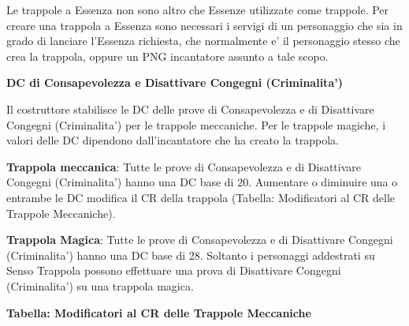 \documentclass[a4paper,11pt,twoside,openany]{dndbook}
\begin{document}
Le trappole a Essenza non sono altro che Essenze utilizzate come trappole. Per creare una trappola a Essenza sono necessari i servigi di un personaggio che sia in grado di lanciare l'Essenza richiesta, che normalmente e' il personaggio stesso che crea la trappola, oppure un PNG incantatore assunto a tale scopo.

\textbf{DC di Consapevolezza e Disattivare Congegni (Criminalita')}

Il costruttore stabilisce le DC delle prove di Consapevolezza e di Disattivare Congegni (Criminalita') per le trappole meccaniche. Per le trappole magiche, i valori delle DC dipendono dall'incantatore che ha creato la trappola.

\textbf{Trappola meccanica}: Tutte le prove di Consapevolezza e di Disattivare Congegni (Criminalita') hanno una DC base di 20. Aumentare o diminuire una o entrambe le DC modifica il CR della trappola (Tabella: Modificatori al CR delle Trappole Meccaniche). 

\textbf{Trappola Magica}: Tutte le prove di Consapevolezza e di Disattivare Congegni (Criminalita') hanno una DC base di 28. Soltanto i personaggi addestrati su Senso Trappola possono effettuare una prova di Disattivare Congegni (Criminalita') su una trappola magica.

\pagebreak

\textbf{Tabella: Modificatori al CR delle Trappole Meccaniche}
\end{document}
